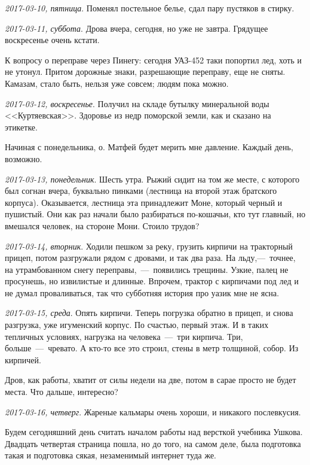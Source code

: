 \documentclass[
    12pt
    ,a4paper
    ,oneside
    ,russian
]{memoir}
\newcommand{\mydatestamp}{
    \bigskip   %
    \emph
}
\newcommand{\mds}{\mydatestamp}
\begin{document}
    \mds{2017-03-10, пятница}. Поменял постельное белье, сдал пару пустяков в стирку.
    
    \mds{2017-03-11, суббота}. Дрова вчера, сегодня, но уже не завтра. Грядущее воскресенье очень кстати.
    
    К вопросу о переправе через Пинегу: сегодня УАЗ-452 таки попортил лед, хоть и не утонул. Притом дорожные знаки, разрешающие переправу, еще не сняты. Камазам, стало быть, нельзя уже совсем; людям пока можно.
    
    \mds{2017-03-12, воскресенье}. Получил на складе бутылку минеральной воды <<Куртяевская>>. Здоровье из недр поморской земли, как и сказано на этикетке.
    
    Начиная с понедельника, о. Матфей будет мерить мне давление. Каждый день, возможно.
    
    \mds{2017-03-13, понедельник}. Шесть утра. Рыжий сидит на том же месте, с которого был согнан вчера, буквально пинками (лестница на второй этаж братского корпуса). Оказывается, лестница эта принадлежит Моне, который черный и пушистый. Они как раз начали было разбираться по-кошачьи, кто тут главный, но вмешался человек, на стороне Мони. Стоило трудов?
    
    \mds{2017-03-14, вторник}. Ходили пешком за реку, грузить кирпичи на тракторный прицеп, потом разгружали рядом с дровами, и так два раза. На льду,---~точнее, на утрамбованном снегу переправы,~---~появились трещины. Узкие, палец не просунешь, но извилистые и длинные. Впрочем, трактор с кирпичами под лед и не думал проваливаться, так что субботняя история про уазик мне не ясна.
    
    \mds{2017-03-15, среда}. Опять кирпичи. Теперь погрузка обратно в прицеп, и снова разгрузка, уже игуменский корпус. По счастью, первый этаж. И в таких тепличных условиях, нагрузка на человека~---~три кирпича. Три, больше~---~чревато. А кто-то все это строил, стены в метр толщиной, собор. Из кирпичей.
    
    Дров, как работы, хватит от силы недели на две, потом в сарае просто не будет места. Что дальше, интересно?
    
    \mds{2017-03-16, четверг}. Жареные кальмары очень хороши, и никакого послевкусия.
    
    Будем сегодняшний день считать началом работы над версткой учебника Ушкова. Двадцать четвертая страница пошла, но до того, на самом деле, была подготовка такая и подготовка сякая, незаменимый интернет туда же.
    
\end{document}
